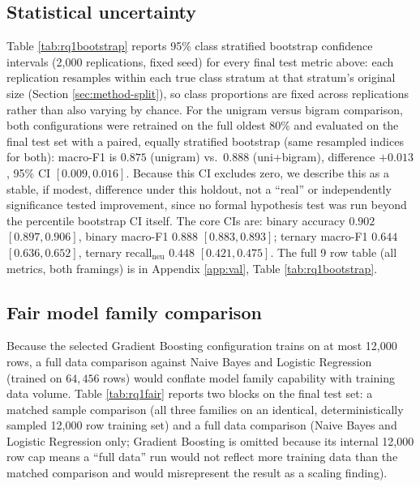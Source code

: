\documentclass[11pt,a4paper,DIV=12]{scrartcl}
\begin{document}
\subsection{Statistical uncertainty}
\label{sec:rq1-uncertainty}
Table \ref{tab:rq1bootstrap} reports 95\% class stratified bootstrap
confidence intervals (2,000 replications, fixed seed) for every final test
metric above: each replication resamples within each true class stratum at
that stratum's original size (Section \ref{sec:method-split}), so class
proportions are fixed across replications rather than also varying by chance.
For the unigram versus bigram comparison, both configurations were retrained on
the full oldest 80\% and evaluated on the final test set with a
paired, equally stratified bootstrap (same resampled indices for
both): macro-F1 is $0.875$ (unigram) vs.\ $0.888$ (uni+bigram), difference
$+0.013$, 95\% CI $[0.009, 0.016]$. Because this CI excludes zero, we describe
this as a stable, if modest, difference under this holdout, not a
``real'' or independently significance tested improvement, since no formal
hypothesis test was run beyond the percentile bootstrap CI itself. The core
CIs are: binary accuracy $0.902$ $[0.897, 0.906]$, binary macro-F1 $0.888$
$[0.883, 0.893]$; ternary macro-F1 $0.644$ $[0.636, 0.652]$, ternary
recall$_{\text{neu}}$ $0.448$ $[0.421, 0.475]$. The full 9 row table (all
metrics, both framings) is in Appendix \ref{app:val}, Table \ref{tab:rq1bootstrap}.

\subsection{Fair model family comparison}
\label{sec:rq1-fair}
Because the selected Gradient Boosting configuration trains on at most
12,000 rows, a full data comparison against Naive Bayes and Logistic
Regression (trained on $64{,}456$ rows) would conflate model family capability
with training data volume. Table \ref{tab:rq1fair} reports two blocks on the
final test set: a matched sample comparison (all three families on an
identical, deterministically sampled 12,000 row training set) and a
full data comparison (Naive Bayes and Logistic Regression only;
Gradient Boosting is omitted because its internal 12,000 row cap means a
``full data'' run would not reflect more training data than the matched
comparison and would misrepresent the result as a scaling finding).
\end{document}
